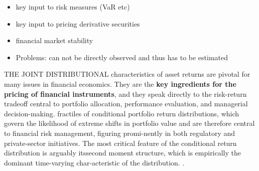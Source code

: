 \begin{itemize}\itemsep0pt
\item key input to risk measures (VaR etc)
\item key input to pricing derivative securities
\item financial market stability
\item Problems: can not be directly observed and thus has to be estimated  
\end{itemize}

THE JOINT DISTRIBUTIONAL characteristics of asset returns are pivotal for many
issues in financial economics. They are the \textbf{key ingredients for the pricing of
financial instruments}, and they speak directly to the risk-return tradeoff central
to portfolio allocation, performance evaluation, and managerial decision-making. 
fractiles of conditional portfolio
return distributions, which govern the likelihood of extreme shifts in portfolio
value and are therefore central to financial risk management, figuring promi-nently in both regulatory and private-sector initiatives. The most critical feature of the conditional return distribution is arguably itssecond moment structure, which is empirically the dominant time-varying char-acteristic of the distribution. \parencite{andersen2018}.